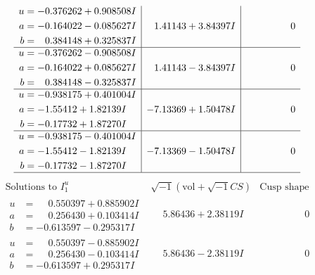 \documentclass[1p]{elsarticle_modified}
\theoremstyle{definition}
\newcommand{\I}{\sqrt{-1}}
\begin{document}
$$\begin{array}{c|c|c}
\begin{aligned}
u &= -0.376262 + 0.908508 I \\
a &= -0.164022 - 0.085627 I \\
b &= \phantom{-}0.384148 + 0.325837 I\end{aligned}
 & \phantom{-}1.41143 + 3.84397 I & \phantom{-0.000000 } 0 \\ \hline\begin{aligned}
u &= -0.376262 - 0.908508 I \\
a &= -0.164022 + 0.085627 I \\
b &= \phantom{-}0.384148 - 0.325837 I\end{aligned}
 & \phantom{-}1.41143 - 3.84397 I & \phantom{-0.000000 } 0 \\ \hline\begin{aligned}
u &= -0.938175 + 0.401004 I \\
a &= -1.55412 + 1.82139 I \\
b &= -0.17732 + 1.87270 I\end{aligned}
 & -7.13369 + 1.50478 I & \phantom{-0.000000 } 0 \\ \hline\begin{aligned}
u &= -0.938175 - 0.401004 I \\
a &= -1.55412 - 1.82139 I \\
b &= -0.17732 - 1.87270 I\end{aligned}
 & -7.13369 - 1.50478 I & \phantom{-0.000000 } 0\\
 \hline 
 \end{array}$$\newpage$$\begin{array}{c|c|c}  
\text{Solutions to }I^u_{1}& \I (\text{vol} + \sqrt{-1}CS) & \text{Cusp shape}\\
 \hline 
\begin{aligned}
u &= \phantom{-}0.550397 + 0.885902 I \\
a &= \phantom{-}0.256430 + 0.103414 I \\
b &= -0.613597 - 0.295317 I\end{aligned}
 & \phantom{-}5.86436 + 2.38119 I & \phantom{-0.000000 } 0 \\ \hline\begin{aligned}
u &= \phantom{-}0.550397 - 0.885902 I \\
a &= \phantom{-}0.256430 - 0.103414 I \\
b &= -0.613597 + 0.295317 I\end{aligned}
 & \phantom{-}5.86436 - 2.38119 I & \phantom{-0.000000 } 0 \\ \hline\begin{aligned}

\end{aligned}
\end{array}$$
\end{document}
